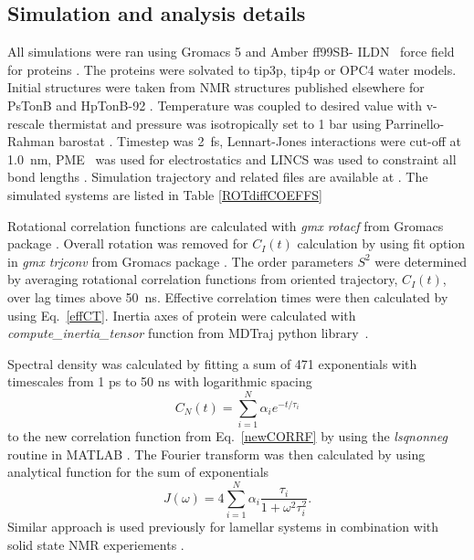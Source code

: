 \documentclass[pre,aps,floatfix,authordate1-4,twocolumn]{revtex4-1}
\begin{document}
\subsection{Simulation and analysis details}
All simulations were ran using Gromacs 5 \cite{abraham15}
and Amber ff99SB- ILDN~\cite{lindorff10} force field for proteins . The proteins were solvated
to tip3p\cite{jorgensen83}, tip4p \cite{jorgensen83} or OPC4 \cite{izadi14} water models.
Initial structures were taken from NMR structures published elsewhere for PsTonB \cite{??}
and HpTonB-92 \cite{ciragan16}. 
Temperature was coupled to desired value with v-rescale thermistat \cite{bussi07} and pressure was 
isotropically set to 1 bar using Parrinello-Rahman barostat \cite{parrinello81}.
Timestep was 2~fs, Lennart-Jones interactions were cut-off at 1.0~nm,
PME~\cite{darden93,essman95} was used for electrostatics and LINCS was used
to constraint all bond lengths \cite{hess07}. Simulation trajectory and related
files are available at \cite{??}. The simulated systems are listed
in Table \ref{ROTdiffCOEFFS}

Rotational correlation functions are calculated with {\it gmx rotacf} from
Gromacs package \cite{gromacsMANUAL}. Overall rotation was removed
for $C_I(t)$ calculation by using fit option in {\it gmx trjconv}
from Gromacs package \cite{gromacsMANUAL}. The order parameters $S^2$
were determined by averaging rotational correlation functions from
oriented trajectory, $C_I(t)$, over lag times above 50~ns. Effective correlation times were then
calculated by using Eq.~\ref{effCT}. 
Inertia axes of protein were calculated with {\it compute\_inertia\_tensor}
function from MDTraj python library~\cite{McGibbon2015MDTraj}.

Spectral density was calculated by fitting a
sum of 471 exponentials with timescales from 1 ps to 50 ns
with logarithmic spacing
\begin{equation}\label{gprime_fit}
C_N(t)=\sum_{i=1}^{N}\alpha_i e^{-t/\tau_i}
\end{equation}
to the new correlation function from Eq.~\ref{newCORRF}
by using the {\it lsqnonneg} routine in MATLAB \cite{matlab}.
The Fourier transform was then calculated by using analytical function
for the sum of exponentials 
\begin{equation}\label{FTanal}
J(\omega) =  4 \sum_{i=1}^{N}\alpha_i\frac{\tau_i}{1+\omega^2\tau_i^2}.
\end{equation}
Similar approach is used previously for lamellar systems in combination
with solid state NMR experiements \cite{nowacka13,ferreira15}.
\end{document}
